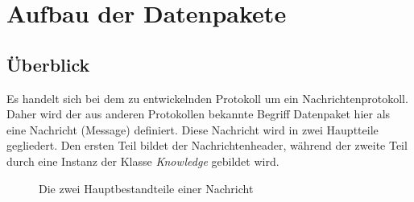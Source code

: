 \section{Aufbau der Datenpakete}
\subsection{Überblick}
Es handelt sich bei dem zu entwickelnden Protokoll um ein Nachrichtenprotokoll. Daher wird der aus anderen Protokollen bekannte Begriff Datenpaket hier als eine Nachricht (Message) definiert. Diese Nachricht wird in zwei Hauptteile gegliedert. Den ersten Teil bildet der Nachrichtenheader, während der zweite Teil durch eine Instanz der Klasse \textit{Knowledge} gebildet wird.
\begin{figure}[H]
	\centering
	\hspace*{1cm}
	\caption{Die zwei Hauptbestandteile einer Nachricht}
	\label{fig:message1}
\end{figure}
